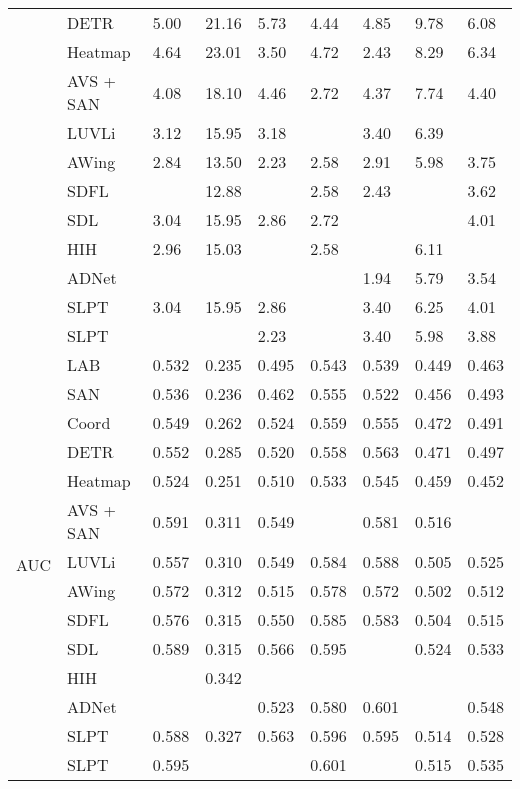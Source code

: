 \documentclass[10pt,twocolumn,letterpaper]{article}
\begin{document}
\begin{table}[H]
\begin{tabular}{m{1.7cm}<{\centering}|m{2.6cm}<{\centering}|m{1.2cm}<{\centering}|m{1.2cm}<{\centering}|m{1.4cm}<{\centering}|m{1.6cm}<{\centering}|m{1.3cm}<{\centering}|m{1.3cm}<{\centering}|m{1.2cm}<{\centering}}
		& DETR & 5.00 & 21.16 & 5.73 & 4.44 & 4.85 & 9.78 & 6.08 \\
		& Heatmap & 4.64 & 23.01 & 3.50 & 4.72 & 2.43 & 8.29 & 6.34 \\
		& AVS + SAN & 4.08 & 18.10 & 4.46 & 2.72 & 4.37 &7.74 & 4.40\\
		& LUVLi & 3.12 & 15.95 & 3.18 & {\color{blue} } & 3.40 & 6.39 & {\color{red} } \\
		& AWing & 2.84 & 13.50 & 2.23 & 2.58 & 2.91 & 5.98 & 3.75 \\
		& SDFL & {\color{red} } & 12.88 & {\color{red} } & 2.58 & 2.43 & {\color{blue} } & 3.62 \\ 
		& SDL & 3.04 & 15.95 & 2.86 & 2.72 & {\color{red} } & {\color{red} } & 4.01 \\
		& HIH & 2.96 & 15.03 & {\color{red} } & 2.58 & {\color{blue} } & 6.11 & {\color{blue} } \\
		& ADNet & {\color{red} } & {\color{blue} } & {\color{blue} } & {\color{blue} } & 1.94 & 5.79 & 3.54\\ \cline{2-9}
		& SLPT & 3.04 & 15.95 & 2.86 & {\color{red} } & 3.40 & 6.25 & 4.01 \\
		& SLPT & {\color{blue} } & {\color{red} } & 2.23 & {\color{red} } & 3.40 & 5.98 & 3.88 \\ \hline
		\multirow{14}{*}{AUC }
		& LAB & 0.532 & 0.235 & 0.495 & 0.543 & 0.539 & 0.449 & 0.463 \\
		& SAN & 0.536 & 0.236 & 0.462 & 0.555 & 0.522 & 0.456 & 0.493 \\
		& Coord & 0.549 & 0.262 & 0.524 & 0.559 & 0.555 & 0.472 & 0.491 \\
		& DETR & 0.552 & 0.285 & 0.520 & 0.558 & 0.563 & 0.471 & 0.497 \\
		& Heatmap & 0.524 & 0.251 & 0.510 & 0.533 & 0.545 & 0.459 & 0.452 \\
		& AVS + SAN & 0.591 & 0.311 & 0.549 & {\color{red}} & 0.581 & 0.516 & {\color{red}} \\
		& LUVLi & 0.557 & 0.310 & 0.549 & 0.584 & 0.588 & 0.505 & 0.525 \\
		& AWing & 0.572 & 0.312 & 0.515 & 0.578 & 0.572 & 0.502 & 0.512 \\
		& SDFL & 0.576 & 0.315 & 0.550 & 0.585 & 0.583 & 0.504 & 0.515 \\ 
		& SDL &  0.589 & 0.315 & 0.566 & 0.595 & {\color{blue}} & 0.524 & 0.533 \\ 
		& HIH & {\color{blue} } & 0.342 & {\color{red}} & {\color{blue}} & {\color{blue}} & {\color{blue}} & {\color{blue}} \\ 
		& ADNet & {\color{red}} & {\color{blue} } & 0.523 & 0.580 & 0.601 & {\color{red}} & 0.548 \\ \cline{2-9}
		& SLPT & 0.588 & 0.327 & 0.563 & 0.596 & 0.595 & 0.514& 0.528 \\
		& SLPT & 0.595 & {\color{red} } & {\color{blue}} & 0.601 & {\color{red} } & 0.515 & 0.535 \\ \hline
		

\end{tabular}
\end{table}
\end{document}

